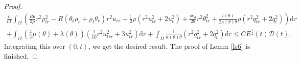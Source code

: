 \documentclass[10pt,a4paper]{amsart}
\newcommand{\dif}{\mathrm{d}}
\begin{document}
\begin{proof}
{\begin{align}
  \frac{\dif}{\dif t} \int_{\Omega} \left(\frac{R\theta}{2\rho} r^2 \rho_{tr}^2 -R(\theta_t \rho_r+\rho_t\theta_r)r^2u_{rr} + \frac{1}{2}\rho( r^2 u_{tr}^2+2u_t^2)+\frac{\rho e_\theta}{2\theta} r^2 \theta_{tr}^2+\frac{\tau(\theta)}{2\kappa(\theta)\theta} \rho (r^2 q_{tr}^2+2q_t^2) \right)\dif r \nonumber\\
+ \int_{\Omega} \left(\frac{4}{3} \mu(\theta)+\lambda(\theta)\right)\left(\frac{1}{10} r^2 u_{trr}^2+3u_{tr}^2\right) \dif r +\int_{\Omega} \frac{1}{\kappa(\theta)\theta} (r^2 q_{tr}^2+2q_t^2) \dif r \le CE^\frac{1}{2}(t) \mathcal D(t). \label{1.51}
 \end{align}}
 Integrating this over $(0, t)$, we get the desired result. The proof of Lemm \ref{le6} is finished.
 \end{proof}
\end{document}
